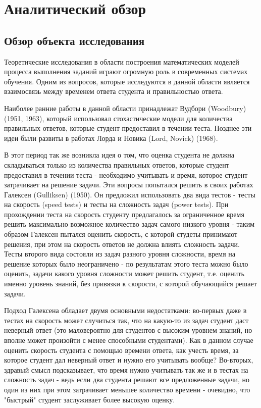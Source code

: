 \chapter{Аналитический обзор}
\label{mainpart} 
\section{Обзор объекта исследования}

Теоретические исследования в области построения математических моделей процесса выполнения заданий играют огромную роль в современных системах обучения. Одним из
вопросов, которые исследуются в данной области является взаимосвязь между временем ответа студента и правильностью ответа.

Наиболее ранние работы в данной области принадлежат Вудбори (Woodbury) (1951, 1963), который использовал стохастические модели для количества правильных ответов, которые студент предоставил в течении теста. Позднее эти идеи были развиты в работах  Лорда и Новика (Lord, Novick) (1968).

В этот период так же возникла идея о том, что оценка студента не должна складываться только из количества правильных ответов, которые студент предоставил в течении теста - необходимо учитывать и время, которое студент затрачивает на решение задачи. Эти вопросы попытался решить в своих работах Галексен (Gulliksen) (1950). Он предложил использовать два вида тестов - тесты на скорость (speed tests) и тесты на сложность задач (power tests). При прохождении теста на скорость студенту предлагалось за ограниченное время решить максимально возможное количество задач самого низкого уровня - таким образом Галексен пытался оценить скорость, с которой студеты принимают решения, при этом на скорость ответов не должна влиять сложность задачи. Тесты второго вида состояли из задач разного уровня сложности, время на решение которых было неограничено - по результатам этого теста можно было оценить, задачи какого уровня сложности может решить студент, т.е. оценить именно уровень знаний, без привязки к скорости, с которой обучающийся решает задачи.

 Подход Галексена обладает двумя основными недостатками: во-первых даже в тестах на скорость может случиться так, что на какую-то из задач студент даст неверный ответ (это маловероятно для студентов с высоким уровнем знаний, но вполне может произойти с менее способными студентами). Как в данном случае оценить скорость студента с помощью времени ответа, как учесть время, за которое студент дал неверный ответ и нужно его учитывать вообще? Во-вторых, здравый смысл подсказывает, что время нужно учитывать так же и в тестах на сложность задач - ведь если два студента решают все предложенные задачи, но один из них при этом затрачивает меньшее количество времени - очевидно, что "быстрый" студент заслуживает более высокую оценку.

